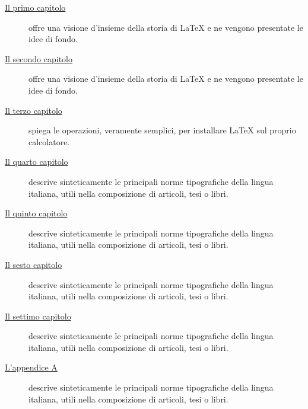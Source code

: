 \begin{description}
\item[{\hyperref[cap:ctbn]{Il primo capitolo}}]
offre una visione d'insieme della storia di \LaTeX{} e ne vengono presentate le idee di fondo.
\item[{\hyperref[cap:ctbnc]{Il secondo capitolo}}]
offre una visione d'insieme della storia di \LaTeX{} e ne vengono presentate le idee di fondo.
\item[{\hyperref[cap:ctbnc]{Il terzo capitolo}}]
spiega le operazioni, veramente semplici, per installare \LaTeX{} sul proprio calcolatore.
\item[{\hyperref[cap:structurallearning]{Il quarto capitolo}}]
descrive sinteticamente le principali norme tipografiche della lingua italiana, utili nella composizione di articoli, tesi o libri.
\item[{\hyperref[cap:ctbnr]{Il quinto capitolo}}]
descrive sinteticamente le principali norme tipografiche della lingua italiana, utili nella composizione di articoli, tesi o libri.
\item[{\hyperref[cap:tsis-sensors]{Il sesto capitolo}}]
descrive sinteticamente le principali norme tipografiche della lingua italiana, utili nella composizione di articoli, tesi o libri.
\item[{\hyperref[cap:concl]{Il settimo capitolo}}]
descrive sinteticamente le principali norme tipografiche della lingua italiana, utili nella composizione di articoli, tesi o libri.
\item[{\hyperref[cap:guide]{L'appendice A}}]
descrive sinteticamente le principali norme tipografiche della lingua italiana, utili nella composizione di articoli, tesi o libri.
\end{description}

